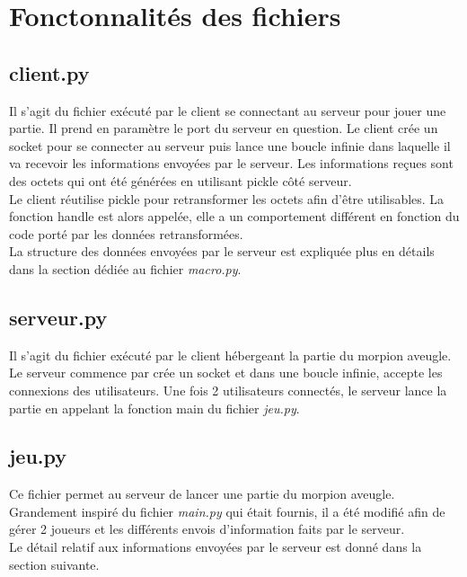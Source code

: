\documentclass[11pt]{report}
\begin{document}

\newpage

\section{Fonctonnalités des fichiers}

\subsection{client.py}

Il s'agit du fichier exécuté par le client se connectant au serveur pour
jouer une partie. Il prend en paramètre le port du serveur en question.
Le client crée un socket pour se connecter au serveur puis lance une boucle
infinie dans laquelle il va recevoir les informations envoyées par le serveur.
Les informations reçues sont des octets qui ont été générées en utilisant pickle
côté serveur. \\
Le client réutilise pickle pour retransformer les octets afin d'être utilisables.
La fonction handle est alors appelée, elle a un comportement différent
en fonction du code porté par les données retransformées. \\
La structure des données envoyées par le serveur est expliquée plus en détails
dans la section dédiée au fichier \textit{macro.py}.

\subsection{serveur.py}

Il s'agit du fichier exécuté par le client hébergeant la partie du morpion
aveugle. Le serveur commence par crée un socket et dans une boucle infinie,
accepte les connexions des utilisateurs.
Une fois 2 utilisateurs connectés, le serveur lance la partie en appelant la
fonction main du fichier \textit{jeu.py}.

\subsection{jeu.py}

Ce fichier permet au serveur de lancer une partie du morpion aveugle.
Grandement inspiré du fichier \textit{main.py} qui était fournis, il a été modifié
afin de gérer 2 joueurs et les différents envois d'information faits par le
serveur. \\
Le détail relatif aux informations envoyées par le serveur est donné dans la
section suivante.
\end{document}
